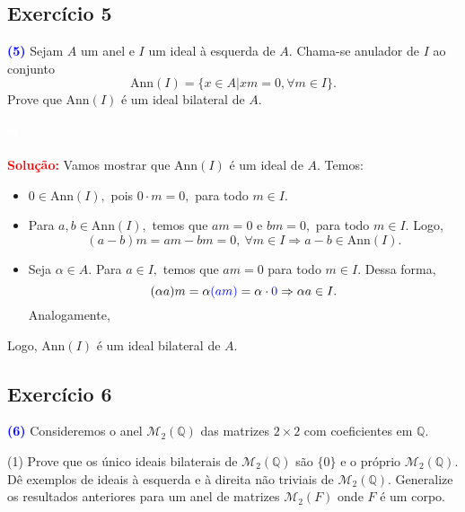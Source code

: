 \documentclass[11pt,a4paper]{article}
\newcommand{\exercicio}[1]{\subsection{Exercício #1} \textcolor{blue}{\bf(#1)}}
\newcommand{\dividiritens}[1]{\begin{tasks}[counter-format={(tsk[a])},label-width=3.6ex, label-format = {\bfseries}, column-sep = {0pt}](1) #1 \end{tasks}}
\newcommand{\pers}[1]{\textcolor{Floresta}{$\negrito{(#1)} $}}
\newcommand{\solucao}[1]{
\textbf{\textcolor{white}{oi}\\ \\ \textcolor{red}{Solução:}} #1}
\begin{document}
\exercicio{5} Sejam $A$ um anel e $I$ um ideal à esquerda de $A.$ Chama-se anulador de $I$ ao conjunto \[
\mbox{Ann}(I) = \{x \in
A | xm = 0, \forall m \in I \}.\] Prove que $\mbox{Ann}(I)$ é um ideal bilateral de $A.$
\solucao{Vamos mostrar que $\mbox{Ann}(I)$ é um ideal de $A.$ Temos:
\begin{itemize}
    \item $0 \in \mbox{Ann}(I),$ pois $0 \cdot m = 0,$ para todo $m \in I.$
    \item Para $a,b \in  \mbox{Ann}(I),$ temos que $am = 0$ e $bm = 0,$ para todo $m \in I.$ Logo,
    \[
    (a-b)m = am - bm = 0, \ \forall m \in I \Rightarrow a-b \in \mbox{Ann}(I).
    \]
    \item Seja $\alpha \in A.$ Para $a \in I,$ temos que $am = 0$ para todo $m \in I.$ Dessa forma,
    \[
    (\alpha a)m = \alpha \textcolor{blue}{(am)} = \alpha \cdot \textcolor{blue}{0} \Rightarrow \alpha a \in I.
    \]
    Analogamente,
\end{itemize}
Logo, $\mbox{Ann}(I)$ é um ideal bilateral de $A.$
}
\exercicio{6} Consideremos o anel $\mathcal{M}_2(\mathbb{Q})$ das matrizes $2 \times 2$ com coeficientes em $\mathbb{Q}.$
\dividiritens{
\task[\pers{a}] Prove que os único ideais bilaterais de $\mathcal{M}_2(\mathbb{Q})$ são $\{ 0\}$ e o próprio $\mathcal{M}_2(\mathbb{Q})$.
\task[\pers{b}] Dê exemplos de ideais à esquerda e à direita não triviais de $\mathcal{M}_2(\mathbb{Q})$.
\task[\pers{c}]  Generalize os resultados anteriores para um anel de matrizes $\mathcal{M}_2(F)$ onde $F$ é um corpo.
}
\end{document}
